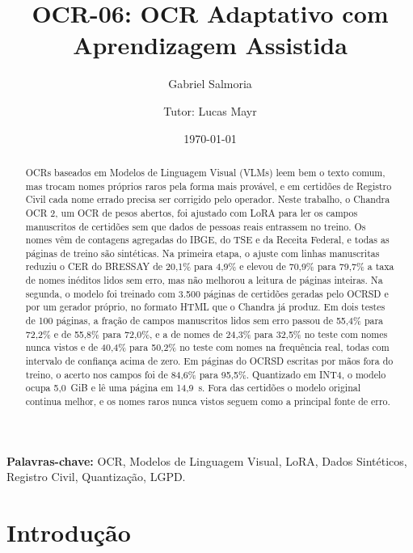 \documentclass[12pt,a4paper]{article}
\title{\textbf{OCR-06: OCR Adaptativo com Aprendizagem Assistida}}
\author{Gabriel Salmoria \and Tutor: Lucas Mayr}
\date{\small \today}
\begin{document}
\maketitle

\begin{abstract}
OCRs baseados em Modelos de Linguagem Visual (VLMs) leem bem o texto comum, mas trocam nomes próprios raros pela forma mais provável, e em certidões de Registro Civil cada nome errado precisa ser corrigido pelo operador. Neste trabalho, o Chandra OCR 2, um OCR de pesos abertos, foi ajustado com LoRA para ler os campos manuscritos de certidões sem que dados de pessoas reais entrassem no treino. Os nomes vêm de contagens agregadas do IBGE, do TSE e da Receita Federal, e todas as páginas de treino são sintéticas. Na primeira etapa, o ajuste com linhas manuscritas reduziu o CER do BRESSAY de 20,1\% para 4,9\% e elevou de 70,9\% para 79,7\% a taxa de nomes inéditos lidos sem erro, mas não melhorou a leitura de páginas inteiras. Na segunda, o modelo foi treinado com 3.500 páginas de certidões geradas pelo OCRSD e por um gerador próprio, no formato HTML que o Chandra já produz. Em dois testes de 100 páginas, a fração de campos manuscritos lidos sem erro passou de 55,4\% para 72,2\% e de 55,8\% para 72,0\%, e a de nomes de 24,3\% para 32,5\% no teste com nomes nunca vistos e de 40,4\% para 50,2\% no teste com nomes na frequência real, todas com intervalo de confiança acima de zero. Em páginas do OCRSD escritas por mãos fora do treino, o acerto nos campos foi de 84,6\% para 95,5\%. Quantizado em INT4, o modelo ocupa 5,0~GiB e lê uma página em 14,9~s. Fora das certidões o modelo original continua melhor, e os nomes raros nunca vistos seguem como a principal fonte de erro.
\end{abstract}

\textbf{Palavras-chave:} OCR, Modelos de Linguagem Visual, LoRA, Dados Sintéticos, Registro Civil, Quantização, LGPD.

\tableofcontents

\section{Introdução}
\label{sec:introducao}
\end{document}
